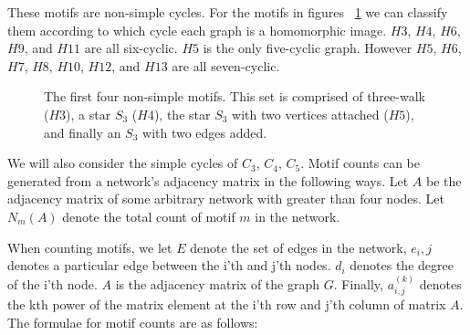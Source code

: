 These motifs are non-simple cycles. For the motifs in figures ~\ref{fig:motifs1} we can classify them according to which cycle 
each graph is a homomorphic image. $H3$, $H4$, $H6$, $H9$, and $H11$ are all six-cyclic. $H5$
is the only five-cyclic graph. However $H5$, $H6$, $H7$, $H8$, $H10$, $H12$, and $H13$ are 
all seven-cyclic.

\begin{figure}[ht!]
    \centering
    \caption{The first four non-simple motifs. This set is comprised
    of three-walk ($H3$), a star $S_3$ ($H4$), the star $S_3$ with two vertices
    attached ($H5$), and finally an $S_3$ with two edges added.}
    \label{fig:motifs1}
\end{figure}



\FloatBarrier

\vspace{3mm} 

We will also consider the simple cycles of $C_3$, $C_4$, $C_5$. Motif counts can be generated from a network's adjacency matrix in the following ways. Let $A$
be the adjacency matrix of some arbitrary network with greater than four nodes. Let $N_m(A)$ denote 
the total count of motif $m$ in the network. 

\vspace{3mm}

When counting motifs, we let $E$ denote the set of edges in the network, $e_i,j$ denotes a particular edge between the 
i'th and j'th nodes. $d_i$ denotes the degree of the i'th node. $A$ is the adjacency matrix of the
 graph $G$. Finally, $a^{(k)}_{i,j}$ denotes the kth power of the matrix 
element at the i'th row and j'th column of matrix $A$. The formulae for motif counts are as follows:

\newpage

